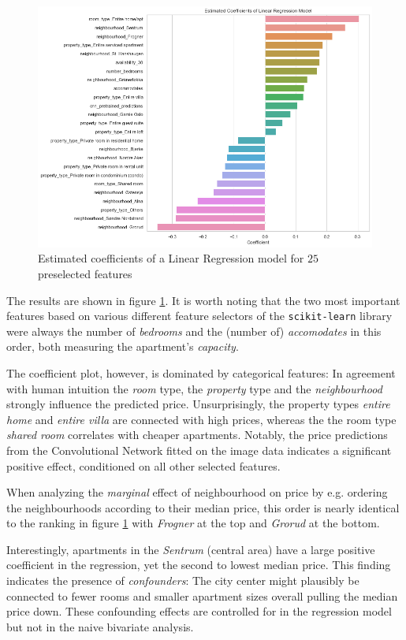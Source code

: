 \documentclass[12pt, letterpaper]{article}
\begin{document}
\begin{figure}[t]
    \centering
    \includegraphics[width=\textwidth]{coefficient_plot.png}
    \caption{Estimated coefficients of a Linear Regression model for $25$ preselected features}
    \label{fig:coefficient-plot}
\end{figure}

The results are shown in figure \ref{fig:coefficient-plot}.
It is worth noting that the two most important features based on various different feature selectors of the \texttt{scikit-learn} library were always the number of \emph{bedrooms} and the (number of) \emph{accomodates} in this order, both measuring the apartment's \emph{capacity}.

The coefficient plot, however, is dominated by categorical features:
In agreement with human intuition the \emph{room} type, the \emph{property} type and the \emph{neighbourhood} strongly influence the predicted price.
Unsurprisingly, the property types \emph{entire home} and \emph{entire villa} are connected with high prices, whereas the the room type \emph{shared room} correlates with cheaper apartments.
Notably, the price predictions from the Convolutional Network fitted on the image data indicates a significant positive effect, conditioned on all other selected features.

When analyzing the \emph{marginal} effect of neighbourhood on price by e.g. ordering the neighbourhoods according to their median price, this order is nearly identical to the ranking in figure \ref{fig:coefficient-plot} with \emph{Frogner} at the top and \emph{Grorud} at the bottom.

Interestingly, apartments in the \emph{Sentrum} (central area) have a large positive coefficient in the regression, yet the second to lowest median price.
This finding indicates the presence of \emph{confounders}:
The city center might plausibly be connected to fewer rooms and smaller apartment sizes overall pulling the median price down.
These confounding effects are controlled for in the regression model but not in the naive bivariate analysis.
\end{document}
